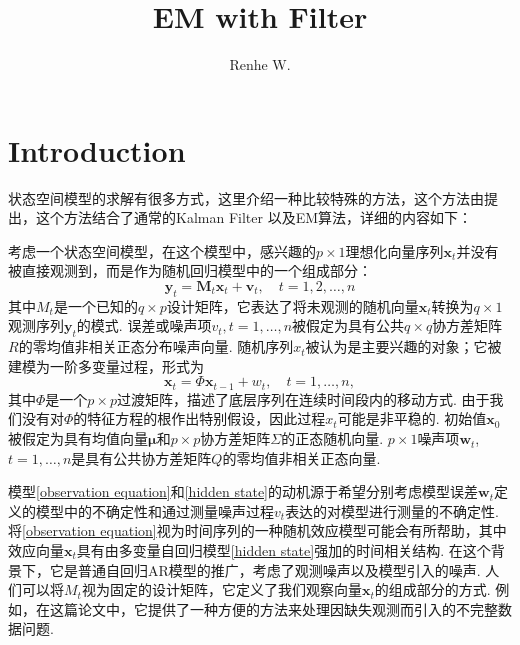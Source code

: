 \documentclass[UTF8,12pt]{ctexart}
\title{EM with Filter}
\author{Renhe W.}
\date{ }
\numberwithin{equation}{section}%
\begin{document}
		
	\maketitle
	\tableofcontents%
	\listoffigures%
	\listoftables%
	\newpage
	\kaishu
	
	
		
	\section{Introduction}
	状态空间模型的求解有很多方式，这里介绍一种比较特殊的方法，这个方法由\citet{shumway1982approach}提出，这个方法结合了通常的Kalman Filter \citep{kalman1960new}以及EM算法\citep{dempster1977maximum}，详细的内容如下：
	
	考虑一个状态空间模型，在这个模型中，感兴趣的$p \times 1$理想化向量序列$\boldsymbol{x}_t$并没有被直接观测到，而是作为随机回归模型中的一个组成部分：
	\begin{equation}\label{observation equation}
		\boldsymbol{y}_t=\boldsymbol{M}_t \boldsymbol{x}_t+\boldsymbol{v}_t, \quad t=1,2, \ldots, n
	\end{equation}
	其中$M_t$是一个已知的$q \times p$设计矩阵，它表达了将未观测的随机向量$\boldsymbol{x}_t$转换为$q \times 1$观测序列$\boldsymbol{y}_t$的模式. 误差或噪声项$v_t, t=1, \ldots, n$被假定为具有公共$q \times q$协方差矩阵$R$的零均值非相关正态分布噪声向量. 随机序列$x_t$被认为是主要兴趣的对象；它被建模为一阶多变量过程，形式为
	\begin{equation}\label{hidden state}
		\boldsymbol{x}_t=\Phi \boldsymbol{x}_{t-1}+w_t, \quad t=1, \ldots, n,
	\end{equation}
	其中$\Phi$是一个$p \times p$过渡矩阵，描述了底层序列在连续时间段内的移动方式. 由于我们没有对$\Phi$的特征方程的根作出特别假设，因此过程$x_t$可能是非平稳的. 初始值$\boldsymbol{x}_0$被假定为具有均值向量$\boldsymbol{\mu}$和$p \times p$协方差矩阵$\Sigma$的正态随机向量. $p \times 1$噪声项$\boldsymbol{w}_t$, $t=1, \ldots, n$是具有公共协方差矩阵$Q$的零均值非相关正态向量.
	
	模型\eqref{observation equation}和\eqref{hidden state}的动机源于希望分别考虑模型误差$\boldsymbol{w}_t$定义的模型中的不确定性和通过测量噪声过程$v_t$表达的对模型进行测量的不确定性. 将\eqref{observation equation}视为时间序列的一种随机效应模型可能会有所帮助，其中效应向量$\boldsymbol{x}_t$具有由多变量自回归模型\eqref{hidden state}强加的时间相关结构. 在这个背景下，它是普通自回归AR模型的推广，考虑了观测噪声以及模型引入的噪声. 人们可以将$M_t$视为固定的设计矩阵，它定义了我们观察向量$\boldsymbol{x}_t$的组成部分的方式. 例如，在这篇论文中，它提供了一种方便的方法来处理因缺失观测而引入的不完整数据问题.
	
\end{document}
